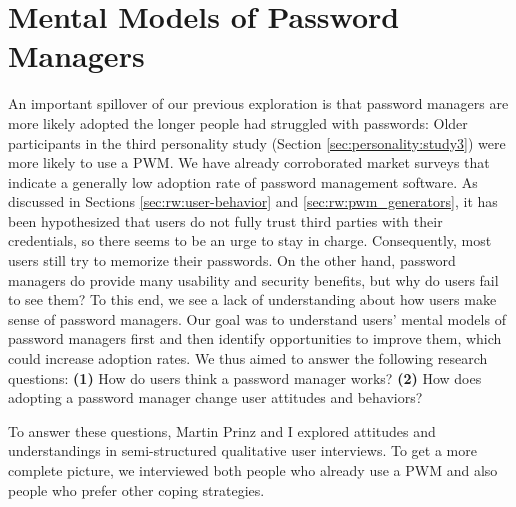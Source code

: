 \chapter[Mental Models of Password Managers]{Mental Models of Password Managers}\label{chap:mental_models_pwm}
An important spillover of our previous exploration is that password managers are more likely adopted the longer people had struggled with passwords: Older participants in the third personality study (Section \ref{sec:personality:study3}) were more likely to use a \gls{PWM}. We have already corroborated market surveys that indicate a generally low adoption rate of password management software. As discussed in Sections \ref{sec:rw:user-behavior} and \ref{sec:rw:pwm_generators}, it has been hypothesized that users do not fully trust third parties with their credentials, so there seems to be an urge to stay in charge. Consequently, most users still try to memorize their passwords. On the other hand, password managers do provide many usability and security benefits, but why do users fail to see them? To this end, we see a lack of understanding about how users make sense of password managers. Our goal was to understand users' mental models of password managers first and then identify opportunities to improve them, which could increase adoption rates. 
We thus aimed to answer the following research questions: 
\textbf{(1)} How do users think a password manager works? 
\textbf{(2)} How does adopting a password manager change user attitudes and behaviors?


To answer these questions, Martin Prinz and I explored attitudes and understandings in semi-structured qualitative user interviews. To get a more complete picture, we interviewed both people who already use a \gls{PWM} and also people who prefer other coping strategies.


